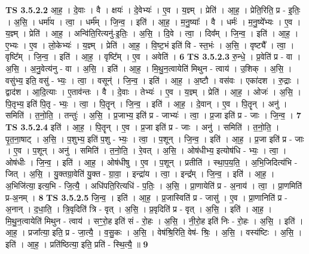 \documentclass[17pt]{extarticle}
\begin{document}
                                \textbf{ TS 3.5.2.2} \newline
                  आ॒ह॒ । दे॒वाः । वै । क्षयः॑ । दे॒वेभ्यः॑ । ए॒व । य॒ज्ञ्म् । प्रेति॑ । आ॒ह॒ । प्रेति॒रिति॒ प्र - इ॒तिः॒ । अ॒सि॒ । धर्मा॑य । त्वा॒ । धर्म᳚म् । जि॒न्व॒ । इति॑ । आ॒ह॒ । म॒नु॒ष्याः᳚ । वै । धर्मः॑ । म॒नु॒ष्ये᳚भ्यः । ए॒व । य॒ज्ञ्म् । प्रेति॑ । आ॒ह॒ । अन्वि॑ति॒रित्यनु॑-इ॒तिः॒ । अ॒सि॒ । दि॒वे । त्वा॒ । दिव᳚म् । जि॒न्व॒ । इति॑ । आ॒ह॒ । ए॒भ्यः । ए॒व । लो॒केभ्यः॑ । य॒ज्ञ्म् । प्रेति॑ । आ॒ह॒ । वि॒ष्ट॒भं इति॑ वि - स्त॒भंः । अ॒सि॒ । वृष्ट्यै᳚ । त्वा॒ । वृष्टि᳚म् । जि॒न्व॒ । इति॑ । आ॒ह॒ । वृष्टि᳚म् । ए॒व । अवेति॑ । \textbf{  6} \newline
                  \newline
                                \textbf{ TS 3.5.2.3} \newline
                  रु॒न्धे॒ । प्र॒वेति॑ प्र - वा । अ॒सि॒ । अ॒नु॒वेत्य॑नु - वा । अ॒सि॒ । इति॑ । आ॒ह॒ । मि॒थु॒न॒त्वायेति॑ मिथुन - त्वाय॑ । उ॒शिक् । अ॒सि॒ । वसु॑भ्य॒ इति॒ वसु॑ - भ्यः॒ । त्वा॒ । वसून्॑ । जि॒न्व॒ । इति॑ । आ॒ह॒ । अ॒ष्टौ । वस॑वः । एका॑दश । रु॒द्राः । द्वाद॑श । आ॒दि॒त्याः । ए॒ताव॑न्तः । वै । दे॒वाः । तेभ्यः॑ । ए॒व । य॒ज्ञ्म् । प्रेति॑ । आ॒ह॒ । ओजः॑ । अ॒सि॒ । पि॒तृभ्य॒ इति॑ पि॒तृ - भ्यः॒ । त्वा॒ । पि॒तॄन् । जि॒न्व॒ । इति॑ । आ॒ह॒ । दे॒वान् । ए॒व । पि॒तॄन् । अनु॑ । समिति॑ । त॒नो॒ति॒ । तन्तुः॑ । अ॒सि॒ । प्र॒जाभ्य॒ इति॑ प्र - जाभ्यः॑ । त्वा॒ । प्र॒जा इति॑ प्र - जाः । जि॒न्व॒ । \textbf{  7} \newline
                  \newline
                                \textbf{ TS 3.5.2.4} \newline
                  इति॑ । आ॒ह॒ । पि॒तॄन् । ए॒व । प्र॒जा इति॑ प्र - जाः । अनु॑ । समिति॑ । त॒नो॒ति॒ । पृ॒त॒ना॒षाट् । अ॒सि॒ । प॒शुभ्य॒ इति॑ प॒शु - भ्यः॒ । त्वा॒ । प॒शून् । जि॒न्व॒ । इति॑ । आ॒ह॒ । प्र॒जा इति॑ प्र - जाः । ए॒व । प॒शून् । अनु॑ । समिति॑ । त॒नो॒ति॒ । रे॒वत् । अ॒सि॒ । ओष॑धीभ्य॒ इत्योष॑धि - भ्यः॒ । त्वा॒ । ओष॑धीः । जि॒न्व॒ । इति॑ । आ॒ह॒ । ओष॑धीषु । ए॒व । प॒शून् । प्रतीति॑ । स्था॒प॒य॒ति॒ । अ॒भि॒जिदित्य॑भि - जित् । अ॒सि॒ । यु॒क्तग्रा॒वेति॑ यु॒क्त - ग्रा॒वा॒ । इन्द्रा॑य । त्वा॒ । इन्द्र᳚म् । जि॒न्व॒ । इति॑ । आ॒ह॒ । अ॒भिजि॑त्या॒ इत्य॒भि - जि॒त्यै॒ । अधि॑पति॒रित्यधि॑ - प॒तिः॒ । अ॒सि॒ । प्रा॒णायेति॑ प्र - अ॒नाय॑ । त्वा॒ । प्रा॒णमिति॑ प्र-अ॒नम् । \textbf{  8} \newline
                  \newline
                                \textbf{ TS 3.5.2.5} \newline
                  जि॒न्व॒ । इति॑ । आ॒ह॒ । प्र॒जास्विति॑ प्र - जासु॑ । ए॒व । प्रा॒णानिति॑ प्र - अ॒नान् । द॒धा॒ति॒ । त्रि॒वृदिति॑ त्रि - वृत् । अ॒सि॒ । प्र॒वृदिति॑ प्र - वृत् । अ॒सि॒ । इति॑ । आ॒ह॒ । मि॒थु॒न॒त्वायेति॑ मिथुन - त्वाय॑ । सꣳ॒॒रो॒ह इति॑ सं - रो॒हः । अ॒सि॒ । नी॒रो॒ह इति॑ निः - रो॒हः । अ॒सि॒ । इति॑ । आ॒ह॒ । प्रजा᳚त्या॒ इति॒ प्र - जा॒त्यै॒ । व॒सु॒कः । अ॒सि॒ । वेष॑श्रि॒रिति॒ वेष॑- श्रिः॒ । अ॒सि॒ । वस्य॑ष्टिः । अ॒सि॒ । इति॑ । आ॒ह॒ । प्रति॑ष्ठित्या॒ इति॒ प्रति॑ - स्थि॒त्यै॒ ॥ \textbf{  9} \newline
\end{document}
